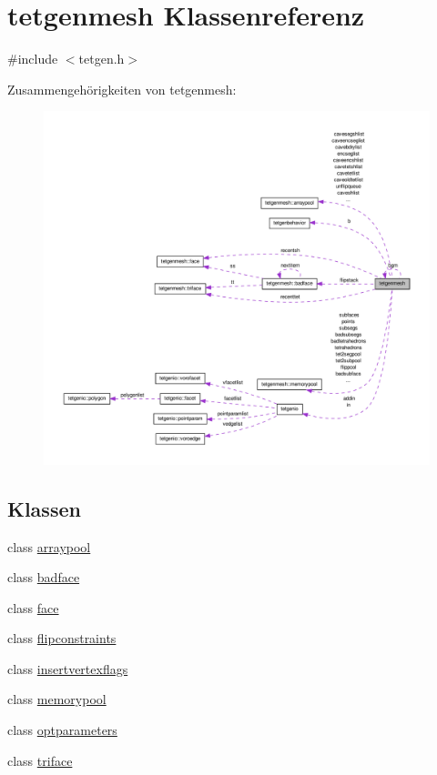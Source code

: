 \hypertarget{classtetgenmesh}{\section{tetgenmesh Klassenreferenz}
\label{classtetgenmesh}
}


{\ttfamily \#include $<$tetgen.\-h$>$}



Zusammengehörigkeiten von tetgenmesh\-:
\nopagebreak
\begin{figure}[H]
\begin{center}
\leavevmode
\includegraphics[width=350pt]{classtetgenmesh__coll__graph}
\end{center}
\end{figure}
\subsection*{Klassen}
\begin{DoxyCompactItemize}
\item 
class \hyperlink{classtetgenmesh_1_1arraypool}{arraypool}
\item 
class \hyperlink{classtetgenmesh_1_1badface}{badface}
\item 
class \hyperlink{classtetgenmesh_1_1face}{face}
\item 
class \hyperlink{classtetgenmesh_1_1flipconstraints}{flipconstraints}
\item 
class \hyperlink{classtetgenmesh_1_1insertvertexflags}{insertvertexflags}
\item 
class \hyperlink{classtetgenmesh_1_1memorypool}{memorypool}
\item 
class \hyperlink{classtetgenmesh_1_1optparameters}{optparameters}
\item 
class \hyperlink{classtetgenmesh_1_1triface}{triface}
\end{DoxyCompactItemize}

